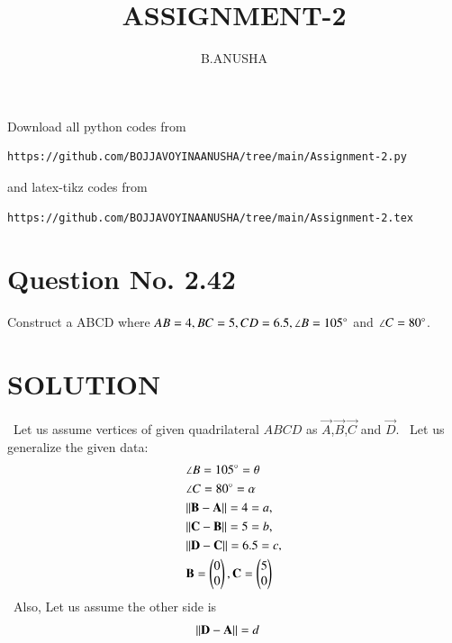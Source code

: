 \documentclass[journal,12pt,twocolumn]{IEEEtran}
\newcommand{\myvec}[1]{\ensuremath{\begin{pmatrix}#1\end{pmatrix}}}
\begin{document}
     \def\topbox#1{\raisebox{-\baselineskip}[0in][0in]{#1}}
     \def\midbox#1{\raisebox{-0.5\baselineskip}[0in][0in]{#1}}
\vspace{3cm}
\title{ASSIGNMENT-2}
\author{B.ANUSHA}
\maketitle
\newpage
\bigskip
\renewcommand{\thefigure}{\theenumi}
\renewcommand{\thetable}{\theenumi}
Download all python codes from 
\begin{lstlisting}
https://github.com/BOJJAVOYINAANUSHA/tree/main/Assignment-2.py
\end{lstlisting}
%
and latex-tikz codes from 
%
\begin{lstlisting}
https://github.com/BOJJAVOYINAANUSHA/tree/main/Assignment-2.tex
\end{lstlisting}
%
\section{Question No. 2.42}
Construct a ABCD where $AB = 4, BC = 5, CD = 6.5, \angle B = 105 \degree$ and $\angle C = 80 \degree$.
%
\section{SOLUTION}
\ Let us assume vertices of given quadrilateral $ABCD$ as $\vec{A}$,$\vec{B}$,$\vec{C}$ and $\vec{D}$.
\ Let us generalize the given data:
    \begin{align}
    &\angle B= 105\degree=\theta 
    \\
    &\angle C= 80\degree=\alpha 
    \\
    &\norm{\vec{B}-\vec{A}} =4=a, 
    \\
    &\norm{\vec{C}-\vec{B}} =5=b, 
    \\
    &\norm{\vec{D}-\vec{C}} =6.5=c,
    \\
    &\vec{B}=\myvec{0\\0}, \vec{C}=\myvec{5\\0}
    \end{align}
\ Also, Let us assume the other side is
\begin{align}
   &\Vert\mathbf{D}-\mathbf{A}\rVert =d 
\end{align}  
\end{document}
